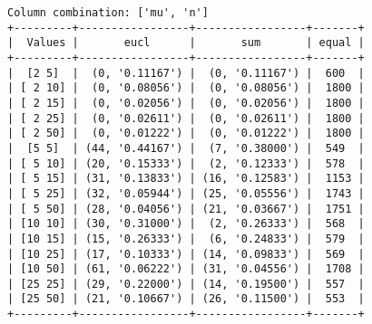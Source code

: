 \documentclass{article}
\begin{document}
\begin{verbatim}
Column combination: ['mu', 'n']
+---------+-----------------+-----------------+-------+
|  Values |       eucl      |       sum       | equal |
+---------+-----------------+-----------------+-------+
|  [2 5]  |  (0, '0.11167') |  (0, '0.11167') |  600  |
| [ 2 10] |  (0, '0.08056') |  (0, '0.08056') |  1800 |
| [ 2 15] |  (0, '0.02056') |  (0, '0.02056') |  1800 |
| [ 2 25] |  (0, '0.02611') |  (0, '0.02611') |  1800 |
| [ 2 50] |  (0, '0.01222') |  (0, '0.01222') |  1800 |
|  [5 5]  | (44, '0.44167') |  (7, '0.38000') |  549  |
| [ 5 10] | (20, '0.15333') |  (2, '0.12333') |  578  |
| [ 5 15] | (31, '0.13833') | (16, '0.12583') |  1153 |
| [ 5 25] | (32, '0.05944') | (25, '0.05556') |  1743 |
| [ 5 50] | (28, '0.04056') | (21, '0.03667') |  1751 |
| [10 10] | (30, '0.31000') |  (2, '0.26333') |  568  |
| [10 15] | (15, '0.26333') |  (6, '0.24833') |  579  |
| [10 25] | (17, '0.10333') | (14, '0.09833') |  569  |
| [10 50] | (61, '0.06222') | (31, '0.04556') |  1708 |
| [25 25] | (29, '0.22000') | (14, '0.19500') |  557  |
| [25 50] | (21, '0.10667') | (26, '0.11500') |  553  |
+---------+-----------------+-----------------+-------+
\end{verbatim}
\end{document}
